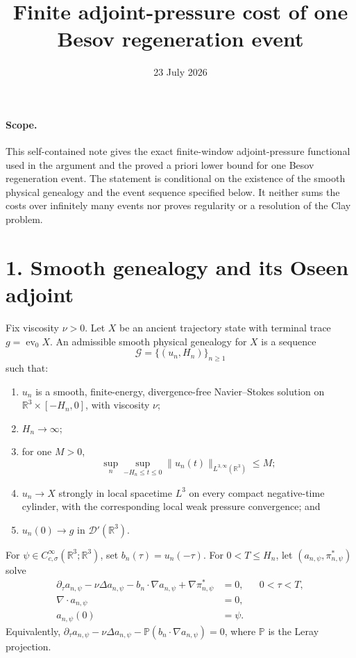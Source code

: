 \documentclass[11pt]{article}
\title{Finite adjoint-pressure cost of one Besov regeneration event}
\author{}
\date{23 July 2026}
\newcommand{\R}{\mathbb R}
\newcommand{\cG}{\mathcal G}
\newcommand{\ev}{\operatorname{ev}}
\newcommand{\weakLthree}{L^{3,\infty}}
\begin{document}
\maketitle

\paragraph{Scope.}
This self-contained note gives the exact finite-window
adjoint-pressure functional used in the argument and the proved
a priori lower bound for one Besov regeneration event.  The statement is
conditional on the existence of the smooth physical genealogy and the
event sequence specified below.  It neither sums the costs over infinitely
many events nor proves regularity or a resolution of the Clay problem.

\section*{1. Smooth genealogy and its Oseen adjoint}

Fix viscosity \(\nu>0\).  Let \(X\) be an ancient trajectory state with
terminal trace \(g=\ev_0X\).  An admissible smooth physical genealogy for
\(X\) is a sequence
\[
  \cG=\{(u_n,H_n)\}_{n\ge1}
\]
such that:
\begin{enumerate}
  \item \(u_n\) is a smooth, finite-energy, divergence-free
        Navier--Stokes solution on
        \(\R^3\times[-H_n,0]\), with viscosity \(\nu\);
  \item \(H_n\to\infty\);
  \item for one \(M>0\),
        \begin{equation}
          \sup_n\sup_{-H_n\le t\le0}
          \|u_n(t)\|_{\weakLthree(\R^3)}
          \le M;
          \label{eq:weak-L3}
        \end{equation}
  \item \(u_n\to X\) strongly in local spacetime \(L^3\) on every
        compact negative-time cylinder, with the corresponding local weak
        pressure convergence; and
  \item \(u_n(0)\to g\) in \(\mathcal D'(\R^3)\).
\end{enumerate}

For \(\psi\in C^\infty_{c,\sigma}(\R^3;\R^3)\), set
\(b_n(\tau)=u_n(-\tau)\).  For \(0<T\le H_n\), let
\((a_{n,\psi},\pi^*_{n,\psi})\) solve
\begin{equation}
  \boxed{
  \begin{aligned}
    \partial_\tau a_{n,\psi}
      -\nu\Delta a_{n,\psi}
      -b_n\cdot\nabla a_{n,\psi}
      +\nabla\pi^*_{n,\psi}&=0,
      &&0<\tau<T,\\
    \nabla\cdot a_{n,\psi}&=0,\\
    a_{n,\psi}(0)&=\psi .
  \end{aligned}}
  \label{eq:adjoint}
\end{equation}
Equivalently,
\(\partial_\tau a_{n,\psi}-\nu\Delta a_{n,\psi}
-\mathbb P(b_n\cdot\nabla a_{n,\psi})=0\), where
\(\mathbb P\) is the Leray projection.
\end{document}

